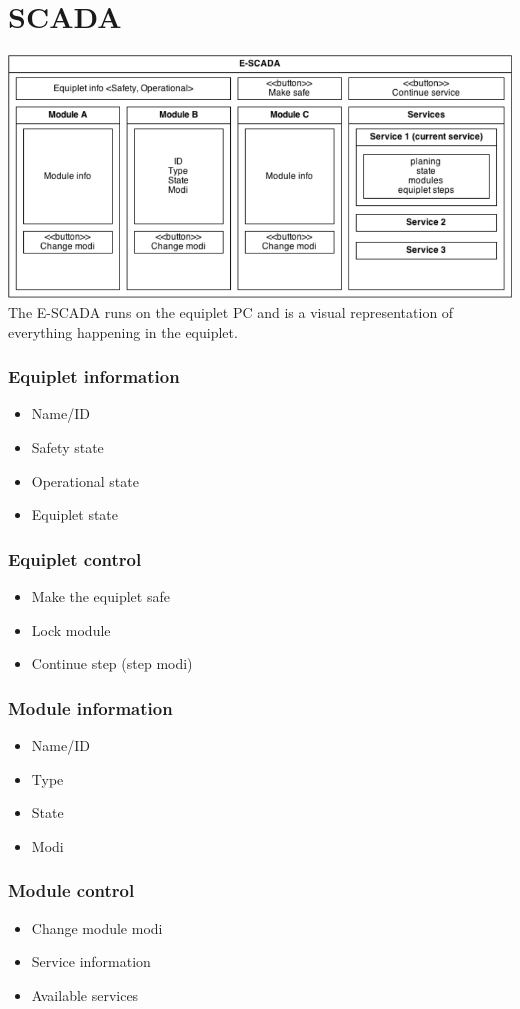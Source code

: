 \documentclass[12pt,a4paper]{report}
\begin{document}
\section{SCADA}
\includegraphics[width=1\textwidth]{pictures/SCADA.png}
The E-SCADA runs on the equiplet PC and is a visual representation of everything happening in the equiplet. 

\subsubsection{Equiplet information}
\begin{itemize}
\item Name/ID
\item Safety state
\item Operational state
\item Equiplet state
\end{itemize}
\subsubsection{Equiplet control}
\begin{itemize}
\item Make the equiplet safe
\item Lock module
\item Continue step (step modi)
\end{itemize}
\subsubsection{Module information}
\begin{itemize}
\item Name/ID
\item Type
\item State
\item Modi
\end{itemize}
\subsubsection{Module control}
\begin{itemize}
\item Change module modi
\item Service information
\item Available services
\end{itemize}
\end{document}
